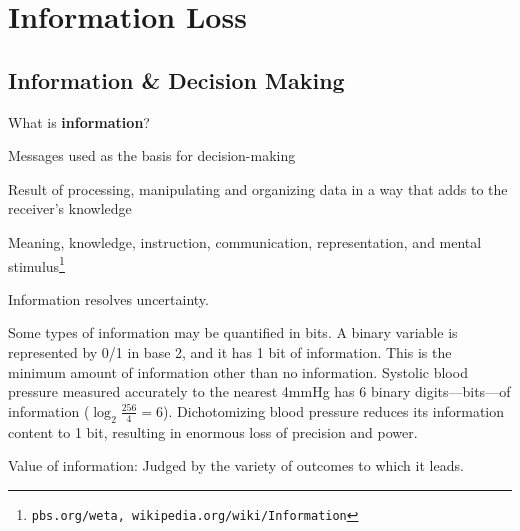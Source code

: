 
\chapter{Information Loss}\label{chap:info}


\section{Information \& Decision Making}
What is \textbf{information}?
\bi
\item Messages used as the basis for decision-making
\item Result of processing, manipulating and organizing data in a way
  that adds to the receiver's knowledge
\item Meaning, knowledge, instruction, communication, representation,
and mental stimulus\footnote{\texttt{pbs.org/weta, wikipedia.org/wiki/Information}}
\ei

Information resolves uncertainty.

Some types of information may be quantified in bits.  A binary
variable is represented by 0/1 in base 2, and it has 1 bit of
information.  This is the minimum amount of information other than no
information.  Systolic blood pressure measured accurately to the
nearest 4mmHg has 6 binary digits---bits---of information
($\log_{2}\frac{256}{4} = 6$).
Dichotomizing blood pressure reduces its information content to 1 bit,
resulting in enormous loss of precision and power.

Value of information: Judged by the variety of outcomes to which it
leads.

